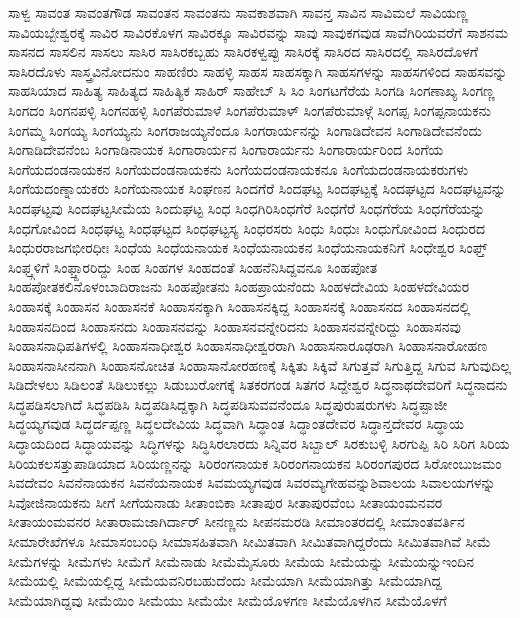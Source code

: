 {ಸಾಳ್ವ
ಸಾವಂತ
ಸಾವಂತಗೌಡ
ಸಾವಂತನ
ಸಾವಂತನು
ಸಾವಕಾಶವಾಗಿ
ಸಾವನ್ತ
ಸಾವಿನ
ಸಾವಿಮಲೆ
ಸಾವಿಯಣ್ಣ
ಸಾವಿಯಬ್ಬೇಶ್ವರಕ್ಕೆ
ಸಾವಿರ
ಸಾವಿರಕೊಳಗ
ಸಾವಿರಕ್ಕೂ
ಸಾವಿರವನ್ನು
ಸಾವು
ಸಾವುಕಗವುಡ
ಸಾವೆಗಿರಿಯವರೆಗೆ
ಸಾಶನಮ
ಸಾಸನದ
ಸಾಸಲಿನ
ಸಾಸಲು
ಸಾಸಿರ
ಸಾಸಿರಕಬ್ಬಹು
ಸಾಸಿರಕಳ್ವಪ್ಪು
ಸಾಸಿರಕ್ಕೆ
ಸಾಸಿರದ
ಸಾಸಿರದಲ್ಲಿ
ಸಾಸಿರದೊಳಗೆ
ಸಾಸಿರದೊಳು
ಸಾಸ್ತ್ರವಿನೋದನುಂ
ಸಾಹಣಿರು
ಸಾಹಳ್ಳಿ
ಸಾಹಸ
ಸಾಹಸಕ್ಕಾಗಿ
ಸಾಹಸಗಳನ್ನು
ಸಾಹಸಗಳಿಂದ
ಸಾಹಸವನ್ನು
ಸಾಹಸಿಯಾದ
ಸಾಹಿತ್ಯ
ಸಾಹಿತ್ಯದ
ಸಾಹಿತ್ಯಿಕ
ಸಾಹಿರ್
ಸಾಹೇಬ್
ಸಿ
ಸಿಂ
ಸಿಂಗಟಗೆರೆಯ
ಸಿಂಗಡಿ
ಸಿಂಗಣಾಖ್ಯ
ಸಿಂಗಣ್ಣ
ಸಿಂಗದಂ
ಸಿಂಗನಪಳ್ಳಿ
ಸಿಂಗನಹಳ್ಳಿ
ಸಿಂಗಪೆರುಮಾಳೆ
ಸಿಂಗಪೆರುಮಾಳ್
ಸಿಂಗಪೆರುಮಾಳ್ಗೆ
ಸಿಂಗಪ್ಪ
ಸಿಂಗಪ್ಪನಾಯಕನು
ಸಿಂಗಮ್ಮ
ಸಿಂಗಯ್ಯ
ಸಿಂಗಯ್ಯನು
ಸಿಂಗರಾಜಯ್ಯನೆಂದೂ
ಸಿಂಗರಾರ್ಯನನ್ನು
ಸಿಂಗಾಡಿದೇವನ
ಸಿಂಗಾಡಿದೇವನೆಂದು
ಸಿಂಗಾಡಿದೇವನೆಂಬ
ಸಿಂಗಾಡಿನಾಯಕ
ಸಿಂಗಾರಾರ್ಯನ
ಸಿಂಗಾರಾರ್ಯನು
ಸಿಂಗಾರಾರ್ಯರಿಂದ
ಸಿಂಗೆಯ
ಸಿಂಗೆಯದಂಡನಾಯಕನ
ಸಿಂಗೆಯದಂಡನಾಯಕನು
ಸಿಂಗೆಯದಂಡನಾಯಕನೂ
ಸಿಂಗೆಯದಂಡನಾಯಕರುಗಳು
ಸಿಂಗೆಯದಂಣ್ನಾಯಕರು
ಸಿಂಗೆಯನಾಯಕ
ಸಿಂಘಣನ
ಸಿಂದಗೆರೆ
ಸಿಂದಘಟ್ಟ
ಸಿಂದಘಟ್ಟಕ್ಕೆ
ಸಿಂದಘಟ್ಟದ
ಸಿಂದಘಟ್ಟವನ್ನು
ಸಿಂದಘಟ್ಟವು
ಸಿಂದಘಟ್ಟಸೀಮೆಯ
ಸಿಂದುಘಟ್ಟ
ಸಿಂಧ
ಸಿಂಧಗಿರಿಸಿಂಧಗೆರೆ
ಸಿಂಧಗೆರೆ
ಸಿಂಧಗೆರೆಯ
ಸಿಂಧಗೆರೆಯನ್ನು
ಸಿಂಧಗೋವಿಂದ
ಸಿಂಧಘಟ್ಟ
ಸಿಂಧಘಟ್ಟದ
ಸಿಂಧಘಟ್ಟಸ್ಯ
ಸಿಂಧರಸರು
ಸಿಂಧು
ಸಿಂಧುಃ
ಸಿಂಧುಗೋವಿಂದ
ಸಿಂಧುರದ
ಸಿಂಧುರರಾಜಗಭೀರಧೀಃ
ಸಿಂಧೆಯ
ಸಿಂಧೆಯನಾಯಕ
ಸಿಂಧೆಯನಾಯಕನ
ಸಿಂಧೆಯನಾಯಕನಿಗೆ
ಸಿಂಧೇಶ್ವರ
ಸಿಂಫ್ತ್
ಸಿಂಫ್ತ್ಗಳಿಗೆ
ಸಿಂಫ್ತ್ದಾರರಿದ್ದು
ಸಿಂಹ
ಸಿಂಹಗಳ
ಸಿಂಹದಂತೆ
ಸಿಂಹನೆನಿಸಿದ್ದವನೂ
ಸಿಂಹಪೋತ
ಸಿಂಹಪೋತಕಲಿನೊಳಂಬಾದಿರಾಜನು
ಸಿಂಹಪೋತನು
ಸಿಂಹಪ್ರಾಯನೆಂದು
ಸಿಂಹಳದೇವಿಯ
ಸಿಂಹಳದೇವಿಯರ
ಸಿಂಹಾಸಕ್ಕೆ
ಸಿಂಹಾಸನ
ಸಿಂಹಾಸನಕೆ
ಸಿಂಹಾಸನಕ್ಕಾಗಿ
ಸಿಂಹಾಸನಕ್ಕಿದ್ದ
ಸಿಂಹಾಸನಕ್ಕೆ
ಸಿಂಹಾಸನದ
ಸಿಂಹಾಸನದಲ್ಲಿ
ಸಿಂಹಾಸನದಿಂದ
ಸಿಂಹಾಸನದು
ಸಿಂಹಾಸನವನ್ನು
ಸಿಂಹಾಸನವನ್ನೇರಿದನು
ಸಿಂಹಾಸನವನ್ನೇರಿದ್ದು
ಸಿಂಹಾಸನವು
ಸಿಂಹಾಸನಾಧಿಪತಿಗಳಲ್ಲಿ
ಸಿಂಹಾಸನಾಧೀಶ್ವರ
ಸಿಂಹಾಸನಾಧೀಶ್ವರರಾಗಿ
ಸಿಂಹಾಸನಾರೂಢರಾಗಿ
ಸಿಂಹಾಸನಾರೋಹಣ
ಸಿಂಹಾಸನಾಸೀನನಾಗಿ
ಸಿಂಹಾಸನೋಚಿತ
ಸಿಂಹಾಸಾನೋರಹಣಕ್ಕೆ
ಸಿಕ್ಕಿತು
ಸಿಕ್ಕಿವೆ
ಸಿಗುತ್ತವೆ
ಸಿಗುತ್ತಿದ್ದ
ಸಿಗುವ
ಸಿಗುವುದಿಲ್ಲ
ಸಿಡಿದೇಳಲು
ಸಿಡಿಲಂತೆ
ಸಿಡಿಲುಕಲ್ಲು
ಸಿಡುಬುರೋಗಕ್ಕೆ
ಸಿತಕರಗಂಡ
ಸಿತಗರ
ಸಿದ್ದೇಶ್ವರ
ಸಿದ್ಧನಾಥದೇವರಿಗೆ
ಸಿದ್ಧನಾದನು
ಸಿದ್ಧಪಡಿಸಲಾಗಿದೆ
ಸಿದ್ಧಪಡಿಸಿ
ಸಿದ್ಧಪಡಿಸಿದ್ದಕ್ಕಾಗಿ
ಸಿದ್ಧಪಡಿಸುವವನೆಂದೂ
ಸಿದ್ಧಪುರುಷರುಗಳು
ಸಿದ್ಧಪ್ಪಾಜೀ
ಸಿದ್ಧಯ್ಯಗವುಡ
ಸಿದ್ಧರ್ದಪ್ಪಣ್ಣ
ಸಿದ್ಧಲದೇವಿಯ
ಸಿದ್ಧವಾಗಿ
ಸಿದ್ಧಾಂತ
ಸಿದ್ಧಾಂತದೇವರ
ಸಿದ್ಧಾನ್ತದೇವರ
ಸಿದ್ಧಾಯ
ಸಿದ್ಧಾಯದಿಂದ
ಸಿದ್ಧಾಯವನ್ನು
ಸಿದ್ಧಿಗಳನ್ನು
ಸಿದ್ಧಿಸಿರಲಾರದು
ಸಿನ್ನಿವರ
ಸಿಬ್ಬಾಲ್
ಸಿರಕುಬಳ್ಳಿ
ಸಿರಗುಪ್ಪಿ
ಸಿರಿ
ಸಿರಿಗ
ಸಿರಿಯ
ಸಿರಿಯಕಲಸತ್ತುಪಾಡಿಯಾದ
ಸಿರಿಯಣ್ಣನನ್ನು
ಸಿರಿರಂಗನಾಯಕ
ಸಿರಿರಂಗನಾಯಕನ
ಸಿರಿರಂಗಪುರದ
ಸಿರೋಂಬುಜಮಂ
ಸಿವದೇವಂ
ಸಿವನೆನಾಯಕನ
ಸಿವನೆಯನಾಯಕ
ಸಿವಮಯ್ಯಗವುಡ
ಸಿವರಮ್ಯಗೇಹವನ್ನುಶಿವಾಲಯ
ಸಿವಾಲಯಗಳನ್ನು
ಸಿವೋಜಿನಾಯಕನು
ಸೀಗೆ
ಸೀಗೆಯನಾಡು
ಸೀತಾಂಬಿಕಾ
ಸೀತಾಪುರ
ಸೀತಾಪುರವೆಂಬ
ಸೀತಾಯಂಮನವರ
ಸೀತಾಯಂಮವನರ
ಸೀತಾರಾಮಜಾಗಿರ್ದಾರ್
ಸೀನಣ್ಣನು
ಸೀಪನಮರಡಿ
ಸೀಮಾಂತರದಲ್ಲಿ
ಸೀಮಾಂತವರ್ತಿನ
ಸೀಮಾರೇಖೆಗಳೂ
ಸೀಮಾಸಂಬಂಧಿ
ಸೀಮಾಸಹಿತವಾಗಿ
ಸೀಮಿತವಾಗಿ
ಸೀಮಿತವಾಗಿದ್ದರೆಂದು
ಸೀಮಿತವಾಗಿವೆ
ಸೀಮೆ
ಸೀಮೆಗಳನ್ನು
ಸೀಮೆಗಳು
ಸೀಮೆಗೆ
ಸೀಮೆನಾಡು
ಸೀಮೆಮೈಸೂರು
ಸೀಮೆಯ
ಸೀಮೆಯನ್ನು
ಸೀಮೆಯನ್ನುಇಂದಿನ
ಸೀಮೆಯಲ್ಲಿ
ಸೀಮೆಯಲ್ಲಿದ್ದ
ಸೀಮೆಯವನಿರಬಹುದೆಂದು
ಸೀಮೆಯಾಗಿ
ಸೀಮೆಯಾಗಿತ್ತು
ಸೀಮೆಯಾಗಿದ್ದ
ಸೀಮೆಯಾಗಿದ್ದವು
ಸೀಮೆಯಿಂ
ಸೀಮೆಯು
ಸೀಮೆಯೇ
ಸೀಮೆಯೊಳಗಣ
ಸೀಮೆಯೊಳಗಿನ
ಸೀಮೆಯೊಳಗೆ
}
